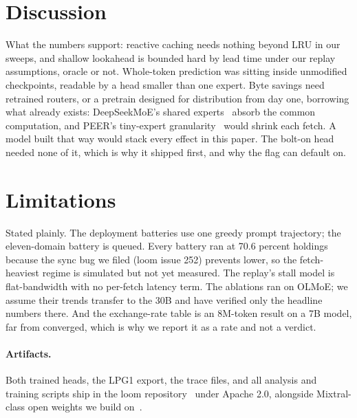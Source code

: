 \documentclass[11pt]{article}
\begin{document}
\section{Discussion}
What the numbers support: reactive caching needs nothing beyond LRU in our sweeps, and shallow lookahead is bounded hard by lead time under our replay assumptions, oracle or not. Whole-token prediction was sitting inside unmodified checkpoints, readable by a head smaller than one expert. Byte savings need retrained routers, or a pretrain designed for distribution from day one, borrowing what already exists: DeepSeekMoE's shared experts~\citep{deepseekmoe,deepseekv3} absorb the common computation, and PEER's tiny-expert granularity~\citep{peer} would shrink each fetch. A model built that way would stack every effect in this paper. The bolt-on head needed none of it, which is why it shipped first, and why the flag can default on.

\section{Limitations}
Stated plainly. The deployment batteries use one greedy prompt trajectory; the eleven-domain battery is queued. Every battery ran at 70.6 percent holdings because the sync bug we filed (loom issue 252) prevents lower, so the fetch-heaviest regime is simulated but not yet measured. The replay's stall model is flat-bandwidth with no per-fetch latency term. The ablations ran on OLMoE; we assume their trends transfer to the 30B and have verified only the headline numbers there. And the exchange-rate table is an 8M-token result on a 7B model, far from converged, which is why we report it as a rate and not a verdict.

\paragraph{Artifacts.} Both trained heads, the LPG1 export, the trace files, and all analysis and training scripts ship in the loom repository~\citep{loom} under Apache 2.0, alongside Mixtral-class open weights we build on~\citep{mixtral,olmoe,qwen3}.



\end{document}
